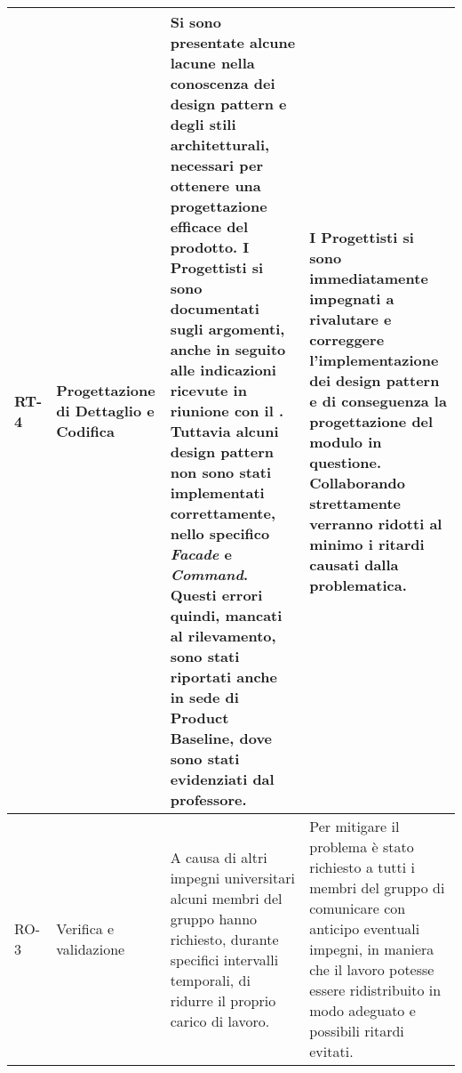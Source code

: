 \begin{appendices}
\begin{longtable}{
		>{\centering}p{}
		>{\centering}p{}
		>{\centering\arraybackslash}p{}
		>{\centering\arraybackslash}p{} }
		RT-4
		&
		Progettazione di Dettaglio e Codifica
		&
		Si sono presentate alcune lacune nella conoscenza dei design pattern\ped{\textit{G}} e degli stili architetturali, necessari per ottenere una progettazione efficace del prodotto\ped{\textit{G}}. I Progettisti si sono documentati sugli argomenti, anche in seguito alle indicazioni ricevute in riunione con il \RC{}. Tuttavia alcuni design pattern\ped{\textit{G}} non sono stati implementati correttamente, nello specifico \textit{Facade} e \textit{Command}. Questi errori quindi, mancati al rilevamento, sono stati riportati anche in sede di Product Baseline\ped{\textit{G}}, dove sono stati evidenziati dal professore.
		&
		I Progettisti si sono immediatamente impegnati a rivalutare e correggere l'implementazione dei design pattern\ped{\textit{G}} e di conseguenza la progettazione del modulo\ped{\textit{G}} in questione. Collaborando strettamente verranno ridotti al minimo i ritardi causati dalla problematica.\\
\hline
		RO-3
		&
		Verifica e validazione
		&
		A causa di altri impegni universitari alcuni membri del gruppo hanno richiesto, durante specifici intervalli temporali, di ridurre il proprio carico di lavoro. 
		&
		Per mitigare il problema è stato richiesto a tutti i membri del gruppo di comunicare con anticipo eventuali impegni, in maniera che il lavoro potesse essere ridistribuito in modo adeguato e possibili ritardi evitati. \\
	\end{longtable}
\end{appendices}
